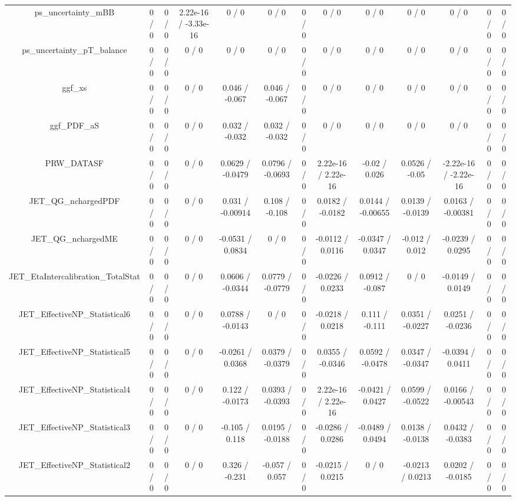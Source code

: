 \documentclass[10pt]{article}
\begin{document}
\begin{table}[htbp]
\begin{center}
\begin{tabular}{|c|c|c|c|c|c|c|c|c|c|c|c|c|}
  ps_uncertainty_mBB & 0 / 0 & 0 / 0 & 2.22e-16 / -3.33e-16 & 0 / 0 & 0 / 0 & 0 / 0 & 0 / 0 & 0 / 0 & 0 / 0 & 0 / 0 & 0 / 0 & 0 / 0 \\ 
  ps_uncertainty_pT_balance & 0 / 0 & 0 / 0 & 0 / 0 & 0 / 0 & 0 / 0 & 0 / 0 & 0 / 0 & 0 / 0 & 0 / 0 & 0 / 0 & 0 / 0 & 0 / 0 \\ 
  ggf_xs & 0 / 0 & 0 / 0 & 0 / 0 & 0.046 / -0.067 & 0.046 / -0.067 & 0 / 0 & 0 / 0 & 0 / 0 & 0 / 0 & 0 / 0 & 0 / 0 & 0 / 0 \\ 
  ggf_PDF_aS & 0 / 0 & 0 / 0 & 0 / 0 & 0.032 / -0.032 & 0.032 / -0.032 & 0 / 0 & 0 / 0 & 0 / 0 & 0 / 0 & 0 / 0 & 0 / 0 & 0 / 0 \\ 
  PRW_DATASF & 0 / 0 & 0 / 0 & 0 / 0 & 0.0629 / -0.0479 & 0.0796 / -0.0693 & 0 / 0 & 2.22e-16 / 2.22e-16 & -0.02 / 0.026 & 0.0526 / -0.05 & -2.22e-16 / -2.22e-16 & 0 / 0 & 0 / 0 \\ 
  JET_QG_nchargedPDF & 0 / 0 & 0 / 0 & 0 / 0 & 0.031 / -0.00914 & 0.108 / -0.108 & 0 / 0 & 0.0182 / -0.0182 & 0.0144 / -0.00655 & 0.0139 / -0.0139 & 0.0163 / -0.00381 & 0 / 0 & 0 / 0 \\ 
  JET_QG_nchargedME & 0 / 0 & 0 / 0 & 0 / 0 & -0.0531 / 0.0834 & 0 / 0 & 0 / 0 & -0.0112 / 0.0116 & -0.0347 / 0.0347 & -0.012 / 0.012 & -0.0239 / 0.0295 & 0 / 0 & 0 / 0 \\ 
  JET_EtaIntercalibration_TotalStat & 0 / 0 & 0 / 0 & 0 / 0 & 0.0606 / -0.0344 & 0.0779 / -0.0779 & 0 / 0 & -0.0226 / 0.0233 & 0.0912 / -0.087 & 0 / 0 & -0.0149 / 0.0149 & 0 / 0 & 0 / 0 \\ 
  JET_EffectiveNP_Statistical6 & 0 / 0 & 0 / 0 & 0 / 0 & 0.0788 / -0.0143 & 0 / 0 & 0 / 0 & -0.0218 / 0.0218 & 0.111 / -0.111 & 0.0351 / -0.0227 & 0.0251 / -0.0236 & 0 / 0 & 0 / 0 \\ 
  JET_EffectiveNP_Statistical5 & 0 / 0 & 0 / 0 & 0 / 0 & -0.0261 / 0.0368 & 0.0379 / -0.0379 & 0 / 0 & 0.0355 / -0.0346 & 0.0592 / -0.0478 & 0.0347 / -0.0347 & -0.0394 / 0.0411 & 0 / 0 & 0 / 0 \\ 
  JET_EffectiveNP_Statistical4 & 0 / 0 & 0 / 0 & 0 / 0 & 0.122 / -0.0173 & 0.0393 / -0.0393 & 0 / 0 & 2.22e-16 / 2.22e-16 & -0.0421 / 0.0427 & 0.0599 / -0.0522 & 0.0166 / -0.00543 & 0 / 0 & 0 / 0 \\ 
  JET_EffectiveNP_Statistical3 & 0 / 0 & 0 / 0 & 0 / 0 & -0.105 / 0.118 & 0.0195 / -0.0188 & 0 / 0 & -0.0286 / 0.0286 & -0.0489 / 0.0494 & 0.0138 / -0.0138 & 0.0432 / -0.0383 & 0 / 0 & 0 / 0 \\ 
  JET_EffectiveNP_Statistical2 & 0 / 0 & 0 / 0 & 0 / 0 & 0.326 / -0.231 & -0.057 / 0.057 & 0 / 0 & -0.0215 / 0.0215 & 0 / 0 & -0.0213 / 0.0213 & 0.0202 / -0.0185 & 0 / 0 & 0 / 0 \\ 

\end{tabular}
\end{center}
\end{table}
\end{document}
